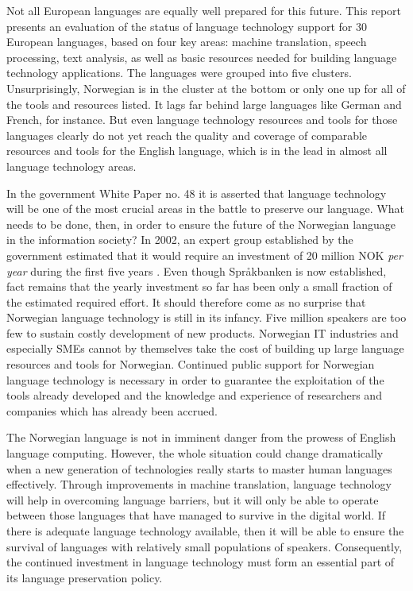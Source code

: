 \begin{multicols}{2}
Not all European languages are equally well prepared for this future. This report presents an evaluation of the status of language technology support for 30 European languages, based on four key areas: machine translation, speech processing, text analysis, as well as basic resources needed for building language technology applications. The languages were grouped into five clusters. Unsurprisingly, Norwegian is in the cluster at the bottom or only one up for all of the tools and resources listed. It lags far behind large languages like German and French, for instance. But even language technology resources and tools for those languages clearly do not yet reach the quality and coverage of comparable resources and tools for the English language, which is in the lead in almost all language technology areas.

In the government White Paper no. 48 \cite{stm48:2002} it is asserted that language technology will be one of the most crucial areas in the battle to preserve our language. What needs to be done, then, in order to ensure the future of the Norwegian language in the information society? In 2002, an expert group established by the government estimated that it would require an investment of 20 million NOK \emph{per year} during the first five years \cite{SR:2002:eng}. Even though Språkbanken is now established, fact remains that the yearly investment so far has been only a small fraction of the estimated required effort. It should therefore come as no surprise that Norwegian language technology is still in its infancy. Five million speakers are too few to sustain costly development of new products. Norwegian IT industries and especially SMEs cannot by themselves take the cost of building up large language resources and tools for Norwegian. Continued public support for Norwegian language technology is necessary in order to guarantee the exploitation of the tools already developed and the knowledge and experience of researchers and companies which has already been accrued.

The Norwegian language is not in imminent danger from the prowess of
English language computing. However, the whole situation could change
dramatically when a new generation of technologies really starts to
master human languages effectively. Through improvements in machine
translation, language technology will help in overcoming language
barriers, but it will only be able to operate between those languages
that have managed to survive in the digital world. If there is
adequate language technology available, then it will be able to ensure
the survival of languages with relatively small populations of
speakers. Consequently, the continued investment in language
technology must form an essential part of its language preservation
policy. 


\end{multicols}
